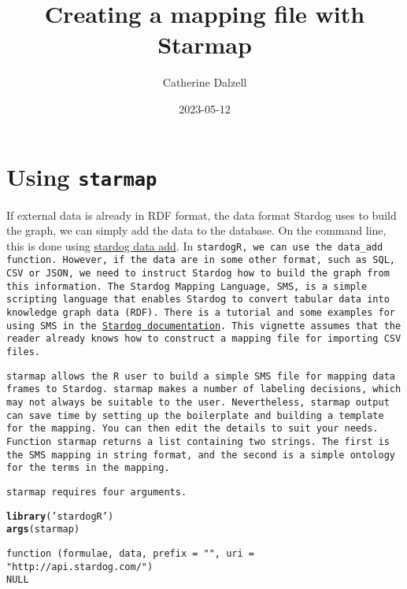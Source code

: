 \documentclass{article}\usepackage[]{graphicx}\usepackage[]{xcolor}
\title{Creating a mapping file with Starmap}
\author{Catherine Dalzell}
\date{2023-05-12}
\makeatletter
\newcommand{\hlstr}[1]{\textcolor[rgb]{0.192,0.494,0.8}{#1}}%
\newcommand{\hlstd}[1]{\textcolor[rgb]{0.345,0.345,0.345}{#1}}%
\newcommand{\hlkwd}[1]{\textcolor[rgb]{0.737,0.353,0.396}{\textbf{#1}}}%
\newenvironment{kframe}{%
 \def\at@end@of@kframe{}%
 \ifinner\ifhmode%
  \def\at@end@of@kframe{\end{minipage}}%
  \begin{minipage}{\columnwidth}%
 \fi\fi%
 \def\FrameCommand##1{\hskip\@totalleftmargin \hskip-\fboxsep
 \colorbox{shadecolor}{##1}\hskip-\fboxsep
     \hskip-\linewidth \hskip-\@totalleftmargin \hskip\columnwidth}%
 \MakeFramed {\advance\hsize-\width
   \@totalleftmargin\z@ \linewidth\hsize
   \@setminipage}}%
 {\par\unskip\endMakeFramed%
 \at@end@of@kframe}
\newenvironment{knitrout}{}{} %
\makeatother
\begin{document}
\maketitle

\tableofcontents

\section{Using \tt{starmap}}

If external data is already in RDF format, the data format Stardog uses to build the graph, we can simply add the data to the database. On the command line, this is done using \href{https://docs.stardog.com/stardog-cli-reference/data/data-add}{stardog data add}. In \tt{stardogR}, we can use the \tt{data\_add} function. However, if the data are in some other format, such as SQL, CSV or JSON, we need to instruct Stardog how to build the graph from this information. The Stardog Mapping Language, \tt{SMS}, is a simple scripting language that enables Stardog to convert tabular data into knowledge graph data (RDF). There is a tutorial and some examples for using SMS in the \href{https://docs.stardog.com/virtual-graphs/importing-json-csv-files}{Stardog documentation}. This vignette assumes that the reader already knows how to construct a mapping file for importing CSV files.

\tt{starmap} allows the R user to build a simple SMS file for mapping data frames to Stardog. \tt{starmap} makes a number of labeling decisions, which may not always be suitable to the user. Nevertheless, \tt{starmap} output can save time by setting up the boilerplate and building a template for the mapping. You can then edit the details to suit your needs. Function \tt{starmap} returns a list containing two strings. The first is the SMS mapping in string format, and the second is a simple ontology for the terms in the mapping.

\tt{starmap} requires four arguments.


\begin{knitrout}
\color{fgcolor}\begin{kframe}
\begin{alltt}
\hlkwd{library}\hlstd{(}\hlstr{'stardogR'}\hlstd{)}
\hlkwd{args}\hlstd{(starmap)}
\end{alltt}
\begin{verbatim}
function (formulae, data, prefix = "", uri = "http://api.stardog.com/") 
NULL
\end{verbatim}
\end{kframe}
\end{knitrout}
\end{document}
